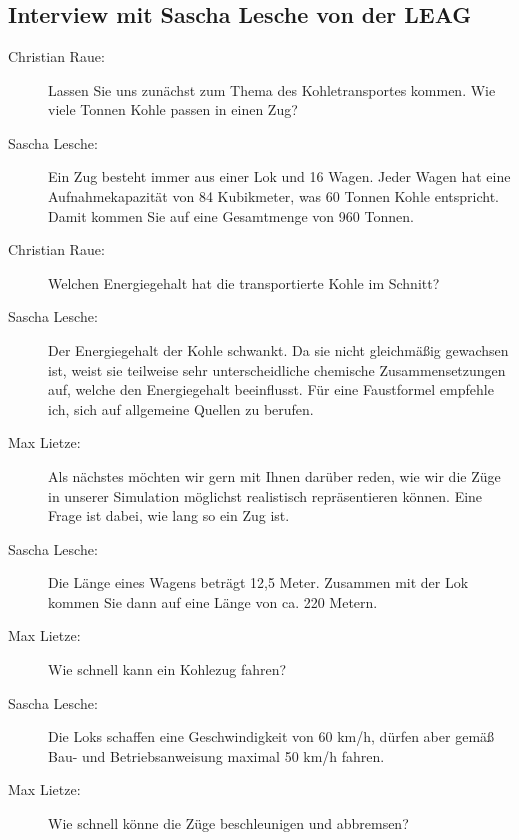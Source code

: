 \chapter{\appendixname}

\section*{Interview mit Sascha Lesche von der LEAG}

\begin{description}

    \item[Christian Raue:] Lassen Sie uns zunächst zum Thema des Kohletransportes kommen. Wie viele Tonnen Kohle passen in einen Zug?

    \item[Sascha Lesche:] Ein Zug besteht immer aus einer Lok und 16 Wagen. Jeder Wagen hat eine Aufnahmekapazität von 84 Kubikmeter, was 60 Tonnen Kohle entspricht. Damit kommen Sie auf eine Gesamtmenge von 960 Tonnen.

    \item[Christian Raue:] Welchen Energiegehalt hat die transportierte Kohle im Schnitt?

    \item[Sascha Lesche:] Der Energiegehalt der Kohle schwankt. Da sie nicht gleichmäßig gewachsen ist, weist sie teilweise sehr unterscheidliche chemische Zusammensetzungen auf, welche den Energiegehalt beeinflusst. Für eine Faustformel empfehle ich, sich auf allgemeine Quellen zu berufen.

    \item[Max Lietze:] Als nächstes möchten wir gern mit Ihnen darüber reden, wie wir die Züge in unserer Simulation möglichst realistisch repräsentieren können. Eine Frage ist dabei, wie lang so ein Zug ist.

    \item[Sascha Lesche:] Die Länge eines Wagens beträgt 12,5 Meter. Zusammen mit der Lok kommen Sie dann auf eine Länge von ca. 220 Metern.

    \item[Max Lietze:] Wie schnell kann ein Kohlezug fahren?

    \item[Sascha Lesche:] Die Loks schaffen eine Geschwindigkeit von 60 km/h, dürfen aber gemäß Bau- und Betriebsanweisung maximal 50 km/h fahren.

    \item[Max Lietze:] Wie schnell könne die Züge beschleunigen und abbremsen?


\end{description}
